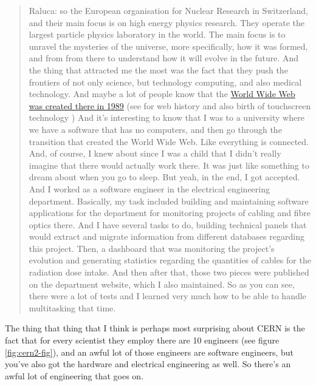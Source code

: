 \documentclass[
]{book}
\begin{document}
\begin{quote}
Raluca: so the European organisation for Nuclear Research in Switzerland, and their main focus is on high energy physics research. They operate the largest particle physics laboratory in the world. The main focus is to unravel the mysteries of the universe, more specifically, how it was formed, and from from there to understand how it will evolve in the future. And the thing that attracted me the most was the fact that they push the frontiers of not only science, but technology computing, and also medical technology. And maybe a lot of people know that the \href{https://home.cern/science/computing/where-web-was-born}{World Wide Web was created there in 1989} (see \citep{cailliau} for web history and also birth of touchscreen technology \citep{stumpe}) And it's interesting to know that I was to a university where we have a software that has no computers, and then go through the transition that created the World Wide Web. Like everything is connected. And, of course, I knew about since I was a child that I didn't really imagine that there would actually work there. It was just like something to dream about when you go to sleep. But yeah, in the end, I got accepted. And I worked as a software engineer in the electrical engineering department. Basically, my task included building and maintaining software applications for the department for monitoring projects of cabling and fibre optics there. And I have several tasks to do, building technical panels that would extract and migrate information from different databases regarding this project. Then, a dashboard that was monitoring the project's evolution and generating statistics regarding the quantities of cables for the radiation dose intake. And then after that, those two pieces were published on the department website, which I also maintained. So as you can see, there were a lot of tests and I learned very much how to be able to handle multitasking that time.
\end{quote}

The thing that thing that I think is perhaps most surprising about CERN is the fact that for every scientist they employ there are 10 engineers (see figure \ref{fig:cern2-fig}), and an awful lot of those engineers are software engineers, but you've also got the hardware and electrical engineering as well. So there's an awful lot of engineering that goes on.
\end{document}
